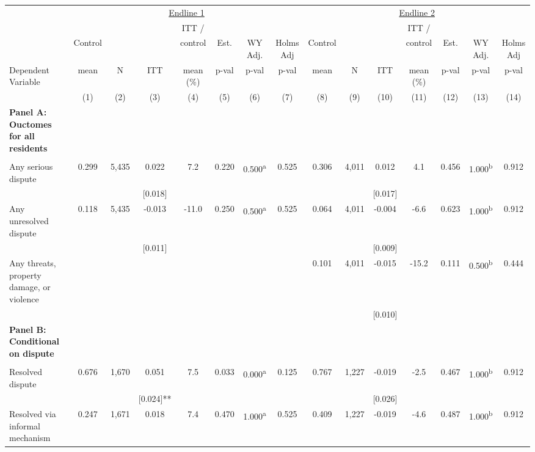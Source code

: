 \begin{tabular}{lcccccccccccccc}
\hline \noalign{\smallskip} & \multicolumn{7}{c}{\uline{\hfill Endline 1 \hfill}} & \multicolumn{7}{c}{\uline{\hfill Endline 2 \hfill}}\\
 &  &  &  & ITT / &  &  &  &  &  &  & ITT / &  &  & \\
 & Control &  &  & control & Est. & WY Adj. & Holms Adj & Control &  &  & control & Est. & WY Adj. & Holms Adj\\
Dependent Variable & mean & N & ITT & mean (\%) & p-val & p-val & p-val & mean & N & ITT & mean (\%) & p-val & p-val & p-val\\
 & (1) & (2) & (3) & (4) & (5) & (6) & (7) & (8) & (9) & (10) & (11) & (12) & (13) & (14)\\
\noalign{\smallskip}\hline \noalign{\smallskip}\textbf{Panel A: Ouctomes for all residents} &  &  &  &  &  &  &  &  &  &  &  &  &  & \\
 &  &  &  &  &  &  &  &  &  &  &  &  &  & \\
Any serious dispute & 0.299 & 5,435 & 0.022 & 7.2 & 0.220 & 0.500\textsuperscript{a} & 0.525 & 0.306 & 4,011 & 0.012 & 4.1 & 0.456 & 1.000\textsuperscript{b} & 0.912\\
 &  &  & [0.018] &  &  &  &  &  &  & [0.017] &  &  &  & \\
Any unresolved dispute & 0.118 & 5,435 & -0.013 & -11.0 & 0.250 & 0.500\textsuperscript{a} & 0.525 & 0.064 & 4,011 & -0.004 & -6.6 & 0.623 & 1.000\textsuperscript{b} & 0.912\\
 &  &  & [0.011] &  &  &  &  &  &  & [0.009] &  &  &  & \\
\phantom{} Any threats, property damage, or violence &  &  &  &  &  &  &  & 0.101 & 4,011 & -0.015 & -15.2 & 0.111 & 0.500\textsuperscript{b} & 0.444\\
 &  &  &  &  &  &  &  &  &  & [0.010] &  &  &  & \\
\textbf{Panel B: Conditional on dispute} &  &  &  &  &  &  &  &  &  &  &  &  &  & \\
 &  &  &  &  &  &  &  &  &  &  &  &  &  & \\
Resolved dispute & 0.676 & 1,670 & 0.051 & 7.5 & 0.033 & 0.000\textsuperscript{a} & 0.125 & 0.767 & 1,227 & -0.019 & -2.5 & 0.467 & 1.000\textsuperscript{b} & 0.912\\
 &  &  & [0.024]** &  &  &  &  &  &  & [0.026] &  &  &  & \\
\quad Resolved via informal mechanism & 0.247 & 1,671 & 0.018 & 7.4 & 0.470 & 1.000\textsuperscript{a} & 0.525 & 0.409 & 1,227 & -0.019 & -4.6 & 0.487 & 1.000\textsuperscript{b} & 0.912\\

\end{tabular}
